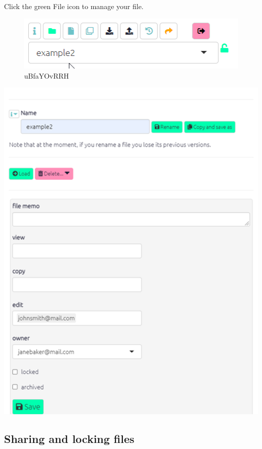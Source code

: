 \documentclass[
]{book}
\begin{document}
Click the green File icon to manage your file.

\begin{figure}
\centering
\includegraphics[width=6.77083in,height=\textheight]{_assets/uBfaYOvRRH.gif}
\caption{uBfaYOvRRH}
\end{figure}

\includegraphics[width=6.77083in,height=\textheight]{_assets/image-20211025111538915.png}

\hypertarget{sharing-and-locking-files}{%
\subsection{Sharing and locking files}\label{sharing-and-locking-files}}
\end{document}
